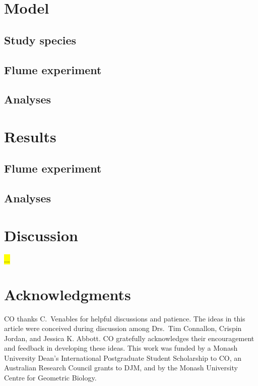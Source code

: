 \documentclass{article}
\begin{document}
\section*{Model}

	\subsection*{Study species}

	\subsection*{Flume experiment}

	\subsection*{Analyses}



\section*{Results}

	\subsection*{Flume experiment}

	\subsection*{Analyses}



\section*{Discussion}

\hl{...}



\section*{Acknowledgments}
CO thanks C.~Venables for helpful discussions and patience. The ideas in this article were conceived during discussion among Drs.~Tim Connallon, Crispin Jordan, and Jessica K. Abbott. CO gratefully acknowledges their encouragement and feedback in developing these ideas. This work was funded by a Monash University Dean's International Postgraduate Student Scholarship to CO, an Australian Research Council grants to DJM, and by the Monash University Centre for Geometric Biology.
\end{document}
